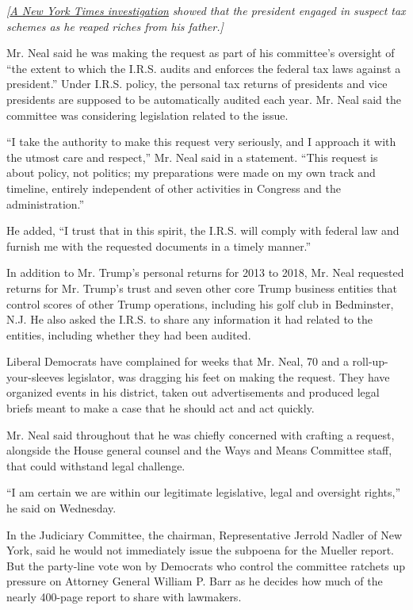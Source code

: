 \emph{{[}}\href{https://www.nytimes.com/interactive/2018/10/02/us/politics/donald-trump-tax-schemes-fred-trump.html}{\emph{A
New York Times investigation}} \emph{showed that the president engaged
in suspect tax schemes as he reaped riches from his father.{]}}

Mr. Neal said he was making the request as part of his committee's
oversight of ``the extent to which the I.R.S. audits and enforces the
federal tax laws against a president.'' Under I.R.S. policy, the
personal tax returns of presidents and vice presidents are supposed to
be automatically audited each year. Mr. Neal said the committee was
considering legislation related to the issue.

``I take the authority to make this request very seriously, and I
approach it with the utmost care and respect,'' Mr. Neal said in a
statement. ``This request is about policy, not politics; my preparations
were made on my own track and timeline, entirely independent of other
activities in Congress and the administration.''

He added, ``I trust that in this spirit, the I.R.S. will comply with
federal law and furnish me with the requested documents in a timely
manner.''

In addition to Mr. Trump's personal returns for 2013 to 2018, Mr. Neal
requested returns for Mr. Trump's trust and seven other core Trump
business entities that control scores of other Trump operations,
including his golf club in Bedminster, N.J. He also asked the I.R.S. to
share any information it had related to the entities, including whether
they had been audited.

Liberal Democrats have complained for weeks that Mr. Neal, 70 and a
roll-up-your-sleeves legislator, was dragging his feet on making the
request. They have organized events in his district, taken out
advertisements and produced legal briefs meant to make a case that he
should act and act quickly.

Mr. Neal said throughout that he was chiefly concerned with crafting a
request, alongside the House general counsel and the Ways and Means
Committee staff, that could withstand legal challenge.

``I am certain we are within our legitimate legislative, legal and
oversight rights,'' he said on Wednesday.

In the Judiciary Committee, the chairman, Representative Jerrold Nadler
of New York, said he would not immediately issue the subpoena for the
Mueller report. But the party-line vote won by Democrats who control the
committee ratchets up pressure on Attorney General William P. Barr as he
decides how much of the nearly 400-page report to share with lawmakers.

